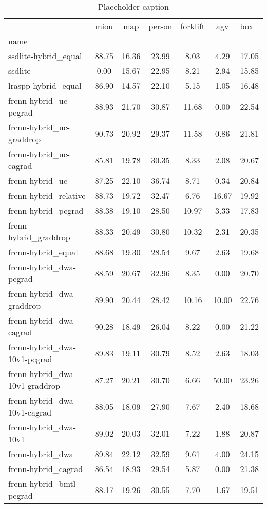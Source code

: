 \begin{table}[H]
\centering
\caption{Placeholder caption}
\label{tab:test-set}
\begin{tabular}{lccccc}
\toprule
 & miou & map & person & forklift & agv & box \\
name &  &  &  &  &  &  \\
\midrule
ssdlite-hybrid_equal & 88.75 & 16.36 & 23.99 & 8.03 & 4.29 & 17.05 \\
ssdlite & 0.00 & 15.67 & 22.95 & 8.21 & 2.94 & 15.85 \\
lraspp-hybrid_equal & 86.90 & 14.57 & 22.10 & 5.15 & 1.05 & 16.48 \\
frcnn-hybrid_uc-pcgrad & 88.93 & 21.70 & 30.87 & 11.68 & 0.00 & 22.54 \\
frcnn-hybrid_uc-graddrop & 90.73 & 20.92 & 29.37 & 11.58 & 0.86 & 21.81 \\
frcnn-hybrid_uc-cagrad & 85.81 & 19.78 & 30.35 & 8.33 & 2.08 & 20.67 \\
frcnn-hybrid_uc & 87.25 & 22.10 & 36.74 & 8.71 & 0.34 & 20.84 \\
frcnn-hybrid_relative & 88.73 & 19.72 & 32.47 & 6.76 & 16.67 & 19.92 \\
frcnn-hybrid_pcgrad & 88.38 & 19.10 & 28.50 & 10.97 & 3.33 & 17.83 \\
frcnn-hybrid_graddrop & 88.33 & 20.49 & 30.80 & 10.32 & 2.31 & 20.35 \\
frcnn-hybrid_equal & 88.68 & 19.30 & 28.54 & 9.67 & 2.63 & 19.68 \\
frcnn-hybrid_dwa-pcgrad & 88.59 & 20.67 & 32.96 & 8.35 & 0.00 & 20.70 \\
frcnn-hybrid_dwa-graddrop & 89.90 & 20.44 & 28.42 & 10.16 & 10.00 & 22.76 \\
frcnn-hybrid_dwa-cagrad & 90.28 & 18.49 & 26.04 & 8.22 & 0.00 & 21.22 \\
frcnn-hybrid_dwa-10v1-pcgrad & 89.83 & 19.11 & 30.79 & 8.52 & 2.63 & 18.03 \\
frcnn-hybrid_dwa-10v1-graddrop & 87.27 & 20.21 & 30.70 & 6.66 & 50.00 & 23.26 \\
frcnn-hybrid_dwa-10v1-cagrad & 88.05 & 18.09 & 27.90 & 7.67 & 2.40 & 18.68 \\
frcnn-hybrid_dwa-10v1 & 89.02 & 20.03 & 32.01 & 7.22 & 1.88 & 20.87 \\
frcnn-hybrid_dwa & 89.84 & 22.12 & 32.59 & 9.61 & 4.00 & 24.15 \\
frcnn-hybrid_cagrad & 86.54 & 18.93 & 29.54 & 5.87 & 0.00 & 21.38 \\
frcnn-hybrid_bmtl-pcgrad & 88.17 & 19.26 & 30.55 & 7.70 & 1.67 & 19.51 \\

\end{tabular}
\end{table}
